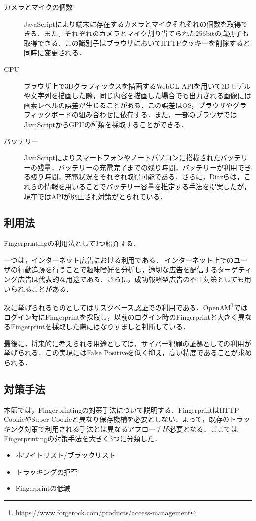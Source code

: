 \begin{description}
\item[カメラとマイクの個数]JavaScriptにより端末に存在するカメラとマイクそれぞれの個数を取得できる\cite{takasu2015survey}．また，それぞれのカメラとマイク割り当てられた256bitの識別子も取得できる．この識別子はブラウザにおいてHTTPクッキーを削除すると同時に変更される．
\item[GPU]ブラウザ上で3Dグラフィックスを描画するWebGL APIを用いて3Dモデルや文字列を描画した際，同じ内容を描画した場合でも出力される画像には画素レベルの誤差が生じることがある．この誤差はOS，ブラウザやグラフィックボードの組み合わせに依存する．また，一部のブラウザではJavaScriptからGPUの種類を採取することができる\cite{mowery2012pixel}．
\item[バッテリー]JavaScriptによりスマートフォンやノートパソコンに搭載されたバッテリーの残量，バッテリーの充電完了までの残り時間，バッテリーが利用できる残り時間，充電状況をそれぞれ取得可能である\cite{takasu2015survey}．さらに，Diazら\cite{diaz2015leaking}は，これらの情報を用いることでバッテリー容量を推定する手法を提案したが，現在ではAPIが廃止され対策がとられている．

\end{description}
\subsection{利用法}
Fingerprintingの利用法として3つ紹介する．

一つは，インターネット広告における利用である．
インターネット上でのユーザの行動追跡を行うことで趣味嗜好を分析し，適切な広告を配信するターゲティング広告は代表的な用途である．さらに，成功報酬型広告の不正対策としても用いられることがある．

次に挙げられるものとしてはリスクベース認証での利用である．OpenAM\footnote{\url{https://www.forgerock.com/products/access-management}}ではログイン時にFingerprintを採取し，以前のログイン時のFingerprintと大きく異なるFingerprintを採取した際にはなりすましと判断している．

最後に，将来的に考えられる用途としては，サイバー犯罪の証拠としての利用が挙げられる．この実現にはFalse Positiveを低く抑え，高い精度であることが求められる．
\subsection{対策手法}
本節では，Fingerprintingの対策手法について説明する．FingerprintはHTTP CookieやSuper Cookieと異なり保存機構を必要としない．よって，既存のトラッキング対策で利用される手法とは異なるアプローチが必要となる．ここではFingerprintingの対策手法を大きく3つに分類した．
\begin{itemize}
\item ホワイトリスト/ブラックリスト
\item トラッキングの拒否
\item Fingerprintの低減
\end{itemize}
